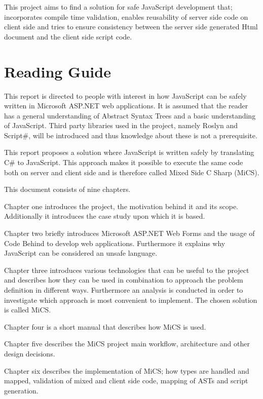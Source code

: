 	This project aims to find a solution for safe JavaScript development that; incorporates compile time validation, enables reusability of server side code on client side and tries to ensure consistency between the server side generated Html document and the client side script code.



\section{Reading Guide}

	This report is directed to people with interest in how JavaScript can be safely written in Microsoft ASP.NET web applications. It is assumed that the reader has a general understanding of Abstract Syntax Trees and a basic understanding of JavaScript. Third party libraries used in the project, namely Roslyn and Script\#, will be introduced and thus knowledge about these is not a prerequisite.

	This report proposes a solution where JavaScript is written safely by translating C\# to JavaScript. This approach makes it possible to execute the same code both on server and client side and is therefore called Mixed Side C Sharp (MiCS).

	This document consists of nine chapters.

	Chapter one introduces the project, the motivation behind it and its scope. Additionally it introduces the case study upon which it is based.

	Chapter two briefly introduces Microsoft ASP.NET Web Forms and the usage of Code Behind to develop web applications. Furthermore it explains why JavaScript can be considered an unsafe language.

	Chapter three introduces various technologies that can be useful to the project and describes how they can be used in combination to approach the problem definition in different ways. Furthermore an analysis is conducted in order to investigate which approach is most convenient to implement. The chosen solution is called MiCS.

	Chapter four is a short manual that describes how MiCS is used.

	Chapter five describes the MiCS project main workflow, architecture and other design decisions.

	Chapter six describes the implementation of MiCS; how types are handled and mapped, validation of mixed and client side code, mapping of ASTs and script generation.

